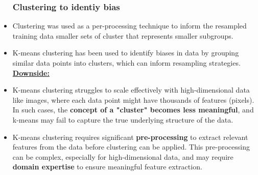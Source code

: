 \documentclass{article}
\begin{document}
\begin{itemize}
\subsubsection{Clustering to identiy bias}
\item Clustering was used as a per-processing technique to inform the resampled training data smaller sets of cluster that represents smaller subgroups.
\item K-means clustering has been used to identify biases in data by grouping similar data points into clusters, which can inform resampling strategies.\\
\textbf{\underline{Downside:}}
\item K-means clustering struggles to scale effectively with high-dimensional data like images, where each data point might have thousands of features (pixels). In such cases, the \textbf{concept of a "cluster" becomes less meaningful}, and k-means may fail to capture the true underlying structure of the data.
\item K-means clustering requires significant \textbf{pre-processing} to extract relevant features from the data before clustering can be applied. This pre-processing can be complex, especially for high-dimensional data, and may require \textbf{domain expertise} to ensure meaningful feature extraction.
\end{itemize}
\end{document}
